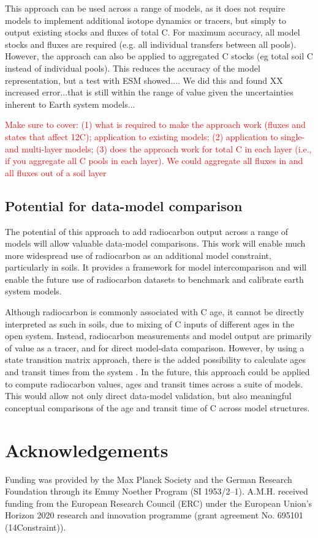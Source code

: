 \documentclass[11pt,a4paper]{article}
\newcommand{\red}[1]{\textcolor{red}{#1}}
\begin{document}
This approach can be used across a range of models, as it does not require models to implement additional isotope dynamics or tracers, but simply to output existing stocks and fluxes of total C. For maximum accuracy, all model stocks and fluxes are required (e.g. all individual transfers between all pools). However, the approach can also be applied to aggregated C stocks (eg total soil C instead of individual pools). This reduces the accuracy of the model representation, but a test with ESM showed.... We did this and found XX increased error...that is still within the range of value given the uncertainties inherent to Earth system models...

\red{Make sure to cover: (1) what is required to make the approach work (fluxes and states that affect 12C); application to existing models; (2) application to single- and multi-layer models; (3) does the approach work for total C in each layer (i.e., if you aggregate all C pools in each layer). We could aggregate all fluxes in and all fluxes out of a soil layer}

\subsection{Potential for data-model comparison}

The potential of this approach to add radiocarbon output across a range of models will allow valuable data-model comparisons. This work will enable much more widespread use of radiocarbon as an additional model constraint, particularly in soils. It provides a framework for model intercomparison and will enable the future use of radiocarbon datasets to benchmark and calibrate earth system models.

Although radiocarbon is commonly associated with C age, it cannot be directly interpreted as such in soils, due to mixing of C inputs of different ages in the open system. Instead, radiocarbon measurements and model output are primarily of value as a tracer, and for direct model-data comparison. However, by using a state transition matrix approach, there is the added possibility to calculate ages and transit times from the system \citep{Metzler2018PNAS}. In the future, this approach could be applied to compute radiocarbon values, ages and transit times across a suite of models. This would allow not only direct data-model validation, but also meaningful conceptual comparisons of the age and transit time of C across model structures. 


\section*{Acknowledgements}
Funding was provided by the Max Planck Society and the German Research Foundation through its Emmy Noether Program (SI 1953/2--1). A.M.H. received funding from the European Research Council (ERC) under the European Union’s Horizon 2020 research and innovation programme (grant agreement No. 695101 (14Constraint)).   


%

\end{document}
